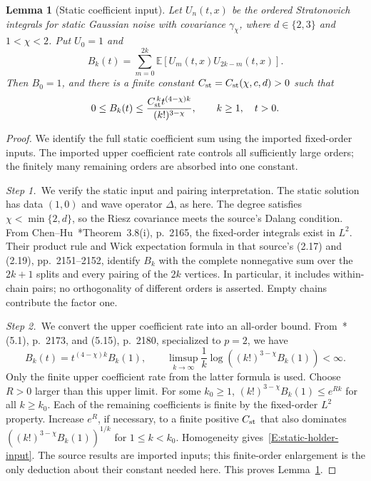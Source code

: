 \documentclass[12pt,oneside,openany]{book}
\numberwithin{equation}{section}
\newtheorem{lemma}[theorem]{Lemma}
\theoremstyle{nogostyle}
\theoremstyle{definition}
\newcommand{\E}{\mathbb{E}}
\begin{document}
\begin{lemma}[Static coefficient input]\label{L:static-holder-input}
  Let $U_n(t,x)$ be the ordered Stratonovich integrals for static Gaussian noise
  with covariance $\gamma_\chi$, where $d \in \{2,3\}$ and $1 < \chi < 2$. Put
  $U_0 = 1$ and
  \[
    B_k(t)=\sum_{m=0}^{2k}\E[U_m(t,x)U_{2k-m}(t,x)].
  \]
  Then $B_0 = 1$, and there is a finite constant $C_{\rm st} = C_{\rm
  st}(\chi,c,d) > 0$ such that
  \begin{equation}\label{E:static-holder-input}
    0\le B_k(t)\le
    \frac{C_{\rm st}^{\,k}t^{(4-\chi)k}}{(k!)^{3-\chi}},
    \qquad k\ge1,\quad t>0.
  \end{equation}
\end{lemma}

\begin{proof}
  We identify the full static coefficient sum using the imported fixed-order
  inputs. The imported upper coefficient rate controls all sufficiently large
  orders; the finitely many remaining orders are absorbed into one constant.


  \medskip
  \noindent\textit{Step 1.~}We verify the static input and pairing
  interpretation.
  The static solution has data $(1,0)$ and wave operator $\Delta$, as here. The
  degree satisfies $\chi < \min\{2,d\}$, so the Riesz covariance meets the
  source's Dalang condition. From
  Chen--Hu~\cite{chen.hu:25:hyperbolic}*{Theorem~3.8(i), p.~2165}, the
  fixed-order integrals exist in $L^2$. Their product rule and Wick expectation
  formula in that source's (2.17) and (2.19), pp.~2151--2152, identify $B_k$
  with the complete nonnegative sum over the $2k+1$ splits and every pairing of
  the $2k$ vertices. In particular, it includes within-chain pairs; no
  orthogonality of different orders is asserted. Empty chains contribute the
  factor one.


  \medskip
  \noindent\textit{Step 2.~}We convert the upper coefficient rate into an
  all-order bound.
  From~\cite{chen.hu:25:hyperbolic}*{(5.1), p.~2173, and (5.15), p.~2180},
  specialized to $p = 2$, we have
  \[
    B_k(t)=t^{(4-\chi)k}B_k(1),\qquad
    \limsup_{k\to\infty}\frac1k
    \log\left((k!)^{3-\chi}B_k(1)\right)<\infty.
  \]
  Only the finite upper coefficient rate from the latter formula is used. Choose
  $R > 0$ larger than this upper limit. For some $k_0 \ge 1$,
  $(k!)^{3-\chi}B_k(1) \le e^{Rk}$ for all $k \ge k_0$. Each of the remaining
  coefficients is finite by the fixed-order $L^2$ property. Increase $e^R$, if
  necessary, to a finite positive $C_{\rm st}$ that also dominates
  $\left((k!)^{3-\chi}B_k(1)\right)^{1/k}$ for $1 \le k < k_0$. Homogeneity
  gives~\eqref{E:static-holder-input}. The source results are imported inputs;
  this finite-order enlargement is the only deduction about their constant
  needed here. This proves Lemma~\ref{L:static-holder-input}.
\end{proof}
\end{document}
